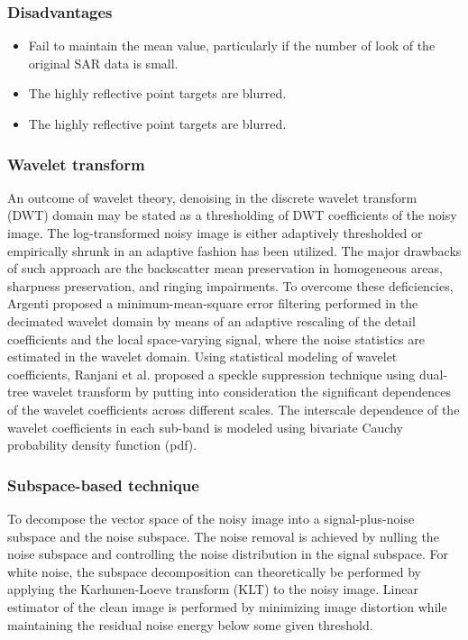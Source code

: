 \subsubsection*{Disadvantages}
\begin{itemize}
	\item Fail to maintain the mean value, particularly if the number of look of the original
SAR data is small.
	\item The highly reflective point targets are blurred.
	\item The highly reflective point targets are blurred.
\end{itemize}

\subsubsection{Wavelet transform}
An outcome of wavelet theory, denoising in the discrete wavelet transform (DWT) domain may be stated as a thresholding of DWT coefficients of the noisy image. The log-transformed noisy image is either adaptively thresholded or empirically shrunk in an adaptive fashion has been utilized. The major drawbacks of such approach are the backscatter mean preservation in homogeneous areas, sharpness preservation, and
ringing impairments. To overcome these deficiencies, Argenti proposed a minimum-mean-square error filtering performed in the decimated wavelet domain by means of
an adaptive rescaling of the detail coefficients and the local space-varying signal, where the noise statistics are estimated in the wavelet domain. Using statistical modeling of wavelet coefficients, Ranjani et al. proposed a speckle suppression technique using dual-tree wavelet transform by putting into consideration the significant dependences of the wavelet coefficients across different scales. The
interscale dependence of the wavelet coefficients in each sub-band is modeled using bivariate Cauchy probability density function (pdf).

\subsubsection{Subspace-based technique}
To decompose the vector space of the noisy image into a signal-plus-noise subspace and the noise subspace. The noise removal is achieved by nulling the noise subspace
and controlling the noise distribution in the signal subspace. For white noise, the subspace decomposition can theoretically be performed by applying the Karhunen-Loeve transform (KLT) to the noisy image. Linear estimator of the clean image is performed by minimizing image distortion while maintaining the residual noise energy below some given threshold.

